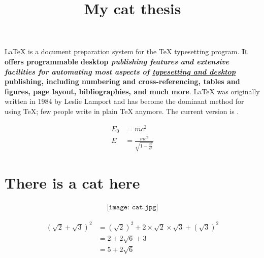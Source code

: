 \documentclass[12pt]{article}
\title{My cat thesis}
\date{}
\begin{document}
  \maketitle
  \tableofcontents
  \pagebreak
  \LaTeX{} is a document preparation system for the \TeX{}
  typesetting program. \textbf{It offers programmable desktop
  \textit{publishing features and extensive facilities for
  automating most aspects of \underline{typesetting and desktop}}
  publishing, including numbering and cross-referencing,
  tables and figures, page layout, bibliographies, and
  much more}. \LaTeX{} was originally written in 1984 by
  Leslie Lamport and has become the dominant method for
  using \TeX; few people write in plain \TeX{} anymore.
  The current version is \LaTeXe.

  \begin{align}
    E_0 &= mc^2                              \\
    E &= \frac{mc^2}{\sqrt{1-\frac{v^2}{c^2}}}
  \end{align}
  
  
  \section[There is a cat]{There is a cat here}
  
  
  \begin{align}
  \texttt{[image: cat.jpg]}
  \end{align}
  
  \begin{align*}
  (\sqrt{2}+\sqrt{3})^2
  &=(\sqrt{2})^2+2\times\sqrt{2}\times\sqrt{
  	3}+(\sqrt{3})^2\\
  &=2+2\sqrt{6}+3\\
  &=5+2\sqrt{6}
  \end{align*}
  
  
  
  
\end{document}
